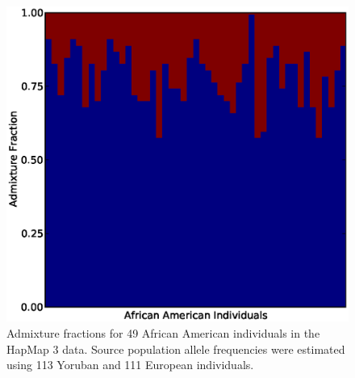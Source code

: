 \documentclass[11pt]{amsart}
\begin{document}




\newpage
\begin{figure}[htp!]
  \begin{center}
    \includegraphics[scale=.6]{afr_hap_map.eps}
    \caption{Admixture fractions for 49 African American individuals in the HapMap 3 data. 
    Source population allele frequencies were estimated using 113 Yoruban and 111 European individuals.}
    \label{structure_plot}
  \end{center}
\end{figure}
\end{document}
